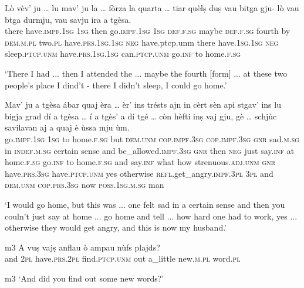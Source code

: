 \begin{linenumbers}
	\gll Lò vèv’ ju … lu mav’ ju la …  fòrza la quarta … tiar quèlṣ duṣ vau bitga gju- lò vau btga durmju, vau savju ira a tgèsa.\\
	there have.\textsc{impf.1sg} \textsc{1sg} {} then go.\textsc{impf.1sg} \textsc{1sg} \textsc{def.f.sg} {} maybe \textsc{def.f.sg} fourth {} by \textsc{dem.m.pl} two.\textsc{pl} have.\textsc{prs.1sg.1sg} \textsc{neg} have.{ptcp.unm} there have.\textsc{1sg.1sg} \textsc{neg} sleep.\textsc{ptcp.unm} have.\textsc{prs.1sg.1sg} can.\textsc{ptcp.unm} go.\textsc{inf} to home.\textsc{f.sg}\\
\end{linenumbers}
\medskip
\glt `There I had ... then I attended the ... maybe the fourth [form] ... at these two people's place I dind't - there I didn't sleep, I could go home.'
\medskip

\begin{linenumbers}
	\gll  Mav’ ju a tgèsa ábar quaj èra … èr’ ins trésts ajn in cèrt sèn api stgav’ ins lu bigja grad dí a tgèsa … í a tgès’ a dí tgé … còn hèfti inṣ vaj gju, gè … schjùc savilavan aj a quaj è ùssa mju ùm.\\
	go.\textsc{impf.1sg} \textsc{1sg} to home.\textsc{f.sg} but \textsc{dem.unm} \textsc{cop.impf.3sg} {} \textsc{cop.impf.3sg} \textsc{gnr} sad.\textsc{m.sg} in \textsc{indef.m.sg} certain sense and be\_allowed.\textsc{impf.3sg} \textsc{gnr} then \textsc{neg} just say.\textsc{inf} at home.\textsc{f.sg} {} go.\textsc{inf} to home.\textsc{f.sg} and say.\textsc{inf} what {} how strenuous.\textsc{adj.unm} \textsc{gnr} have.\textsc{prs.3sg} have.\textsc{ptcp.unm} yes {} otherwise \textsc{refl}.get\_angry.\textsc{impf.3pl} \textsc{3pl} and \textsc{dem.unm} \textsc{cop.prs.3sg} now \textsc{poss.1sg.m.sg} man\\
\end{linenumbers}
\medskip
\glt `I would go home, but this was ... one felt sad in a certain sense and then you couln't just say at home ... go home and tell ... how hard one had to work, yes ... otherwise they would get angry, and this is now my husband.'
\medskip

\begin{linenumbers}
	\gll {\ob}m3{\cb} A vuṣ vajṣ anflau ò ampau nùfs plajds?    \\
	{} and \textsc{2pl} have.\textsc{prs.2pl} find.\textsc{ptcp.unm} out a\_little new.\textsc{m.pl} word.\textsc{pl}\\
\end{linenumbers}
\medskip
\glt {\ob}m3{\cb} `And did you find out some new words?'
\medskip

